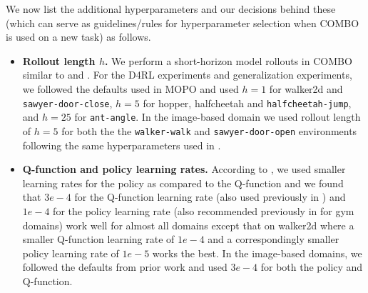 We now list the additional hyperparameters and our decisions behind these (which can serve as guidelines/rules for hyperparameter selection when COMBO is used on a new task)  as follows.
\begin{itemize}
    \item \textbf{Rollout length $h$.} We perform a short-horizon model rollouts in COMBO similar to \citet{yu2020mopo} and \citet{Rafailov2020LOMPO}. For the D4RL experiments and generalization experiments, we followed the defaults used in MOPO and used $h = 1$ for walker2d and \texttt{sawyer-door-close}, $h=5$ for hopper, halfcheetah and \texttt{halfcheetah-jump}, and $h=25$ for \texttt{ant-angle}. In the image-based domain we used rollout length of $h=5$ for both the the \texttt{walker-walk} and \texttt{sawyer-door-open} environments following the same hyperparameters used in \citet{Rafailov2020LOMPO}.
    \item \textbf{Q-function and policy learning rates.} According to \citet{kumar2020conservative}, we used smaller learning rates for the policy as compared to the Q-function and 
    we found that $3e-4$ for the Q-function learning rate (also used previously in \citet{kumar2020conservative}) and $1e-4$ for the policy learning rate (also recommended previously in \citet{kumar2020conservative} for gym domains) work well for almost all domains except that on walker2d where a smaller Q-function learning rate of $1e-4$ and a correspondingly smaller policy learning rate of $1e-5$ works the best. In the image-based domains, we followed the defaults from prior work \citep{Rafailov2020LOMPO} and used $3e-4$ for both the policy and Q-function.
    

\end{itemize}
